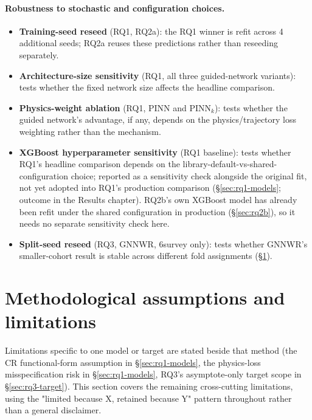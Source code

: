 {\paragraph*{Robustness to stochastic and configuration choices.}
\begin{itemize}
\setlength\itemsep{0pt}
\item \textbf{Training-seed reseed} (RQ1, RQ2a): the RQ1 winner is refit across 4 additional seeds; RQ2a reuses these predictions rather than reseeding separately.
\item \textbf{Architecture-size sensitivity} (RQ1, all three guided-network variants): tests whether the fixed network size affects the headline comparison.
\item \textbf{Physics-weight ablation} (RQ1, PINN and PINN$_k$): tests whether the guided network's advantage, if any, depends on the physics/trajectory loss weighting rather than the mechanism.
\item \textbf{XGBoost hyperparameter sensitivity} (RQ1 baseline): tests whether RQ1's headline comparison depends on the library-default-vs-shared-configuration choice; reported as a sensitivity check alongside the original fit, not yet adopted into RQ1's production comparison (\S\ref{sec:rq1-models}; outcome in the Results chapter). RQ2b's own XGBoost model has already been refit under the shared configuration in production (\S\ref{sec:rq2b}), so it needs no separate sensitivity check here.
\item \textbf{Split-seed reseed} (RQ3, GNNWR, 6survey only): tests whether GNNWR's smaller-cohort result is stable across different fold assignments (\S\ref{sec:limitations}).
\end{itemize}

\section{Methodological assumptions and limitations}
\label{sec:limitations}
Limitations specific to one model or target are stated beside that method (the CR functional-form assumption in \S\ref{sec:rq1-models}, the physics-loss misspecification risk in \S\ref{sec:rq1-models}, RQ3's asymptote-only target scope in \S\ref{sec:rq3-target}). This section covers the remaining cross-cutting limitations, using the "limited because X, retained because Y" pattern throughout rather than a general disclaimer.

}
